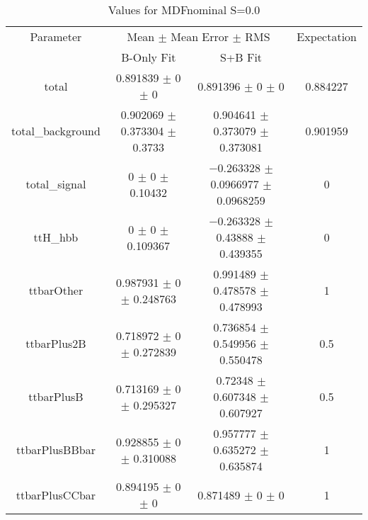 \begin{table}
\centering
\caption{Values for MDFnominal S=0.0}
\begin{tabular}{cccc}
\toprule
Parameter & \multicolumn{2}{c}{Mean $\pm$ Mean Error $\pm$ RMS} & Expectation\\
 & B-Only Fit & S+B Fit & \\
\midrule
total & \num{0.891839} $\pm$ \num{0} $\pm$ \num{0} & \num{0.891396} $\pm$ \num{0} $\pm$ \num{0} & \num{0.884227}\\
total\_background & \num{0.902069} $\pm$ \num{0.373304} $\pm$ \num{0.3733} & \num{0.904641} $\pm$ \num{0.373079} $\pm$ \num{0.373081} & \num{0.901959}\\
total\_signal & \num{0} $\pm$ \num{0} $\pm$ \num{0.10432} & \num{-0.263328} $\pm$ \num{0.0966977} $\pm$ \num{0.0968259} & \num{0}\\
ttH\_hbb & \num{0} $\pm$ \num{0} $\pm$ \num{0.109367} & \num{-0.263328} $\pm$ \num{0.43888} $\pm$ \num{0.439355} & \num{0}\\
ttbarOther & \num{0.987931} $\pm$ \num{0} $\pm$ \num{0.248763} & \num{0.991489} $\pm$ \num{0.478578} $\pm$ \num{0.478993} & \num{1}\\
ttbarPlus2B & \num{0.718972} $\pm$ \num{0} $\pm$ \num{0.272839} & \num{0.736854} $\pm$ \num{0.549956} $\pm$ \num{0.550478} & \num{0.5}\\
ttbarPlusB & \num{0.713169} $\pm$ \num{0} $\pm$ \num{0.295327} & \num{0.72348} $\pm$ \num{0.607348} $\pm$ \num{0.607927} & \num{0.5}\\
ttbarPlusBBbar & \num{0.928855} $\pm$ \num{0} $\pm$ \num{0.310088} & \num{0.957777} $\pm$ \num{0.635272} $\pm$ \num{0.635874} & \num{1}\\
ttbarPlusCCbar & \num{0.894195} $\pm$ \num{0} $\pm$ \num{0} & \num{0.871489} $\pm$ \num{0} $\pm$ \num{0} & \num{1}\\
\bottomrule
\end{tabular}
\end{table}
